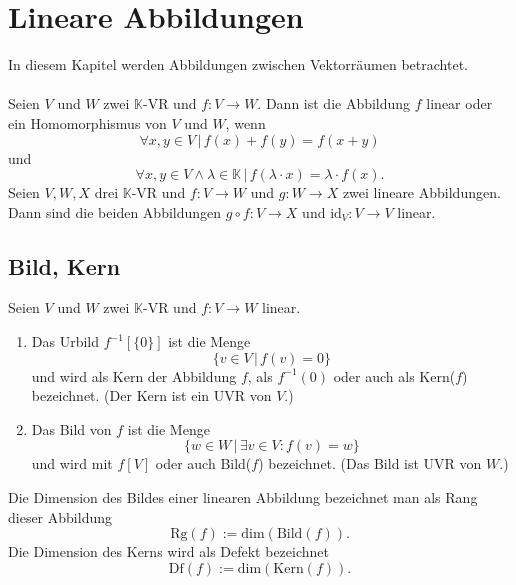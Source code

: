 \documentclass[a4paper,12pt]{article}
\numberwithin{equation}{section}
\begin{document}
\section{Lineare Abbildungen}
In diesem Kapitel werden Abbildungen zwischen Vektorräumen betrachtet.\\\\
Seien $V$ und $W$ zwei $\mathbb{K}$-VR und $f:V\rightarrow W$. Dann ist die Abbildung $f$ linear oder ein Homomorphismus von $V$ und $W$, wenn
\[ 
        \forall x,y \in V\,|\, f\left(x\right)+f\left(y\right)=f\left(x+y\right)
\] 
und
\[ 
        \forall x,y \in V\land \lambda  \in \mathbb{K}\,|\, f\left(\lambda \cdot x\right)=\lambda \cdot f\left(x\right)
.\] 
Seien $V,W,X$ drei $\mathbb{K}$-VR und $f:V\rightarrow W$ und $g:W\rightarrow X$ zwei lineare Abbildungen. Dann sind die beiden Abbildungen $g\circ f:V\rightarrow X$ und $\text{id}_V:V\rightarrow V$ linear.
 
\subsection{Bild, Kern}
Seien $V$ und $W$ zwei $\mathbb{K}$-VR und $f:V\rightarrow W$ linear.
\begin{enumerate}[label=\arabic*]
        \item Das Urbild $f^{-1}[\{0\}]$ ist die Menge 
                \[ 
                        \{v \in V\,|\, f\left(v\right)=0\}
                \] 
                und wird als Kern der Abbildung $f$, als $f^{-1}\left(0\right)$ oder auch als Kern($f$) bezeichnet. (Der Kern ist ein UVR von $V$.)
        \item Das Bild von $f$ ist die Menge
                \[ 
                        \{w \in W\,|\, \exists v \in V:f\left(v\right)=w\}
                \] 
                und wird mit $f[V]$ oder auch Bild($f$) bezeichnet. (Das Bild ist UVR von $W$.) 
\end{enumerate}
Die Dimension des Bildes einer linearen Abbildung bezeichnet man als Rang dieser Abbildung
\[ 
        \text{Rg}\left(f\right):=\text{dim}\left(\text{Bild}\left(f\right)\right)
.\] 
Die Dimension des Kerns wird als Defekt bezeichnet
\[ 
        \text{Df}\left(f\right):=\text{dim}\left(\text{Kern}\left(f\right)\right)
.\] 
\end{document}
